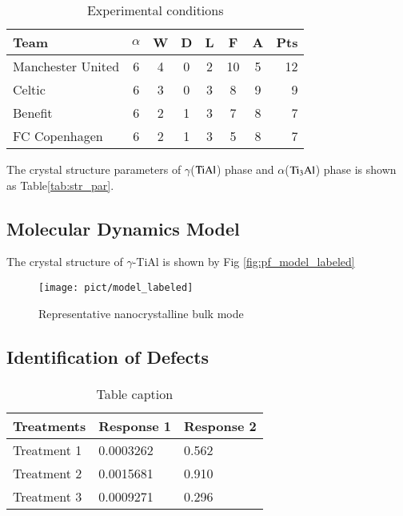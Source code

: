 \documentclass[final,5p,times,twocolumn]{elsarticle}
\begin{document}
\begin{table}[H]
\centering
\caption{Experimental conditions}
\begin{tabular}{l*{6}{c}r}	
		\hline
		Team              & $\alpha$ & W & D & L & F  & A & Pts \\
		\hline
		Manchester United & 6 & 4 & 0 & 2 & 10 & 5 & 12  \\
		Celtic            & 6 & 3 & 0 & 3 &  8 & 9 &  9  \\
		Benefit          & 6 & 2 & 1 & 3 &  7 & 8 &  7  \\
		FC Copenhagen     & 6 & 2 & 1 & 3 &  5 & 8 &  7  \\
		\hline
\end{tabular}
\label{Tab:par}
\end{table}


The crystal structure parameters of $\gamma$($\rm TiAl$) phase and $\alpha$($\rm Ti_3Al$) phase is shown as Table\ref{tab:str_par}. 
\subsection{Molecular Dynamics Model}
The crystal structure of $\gamma$-TiAl
is shown by Fig \ref{fig:pf_model_labeled}

\begin{figure}
	\centering
	\texttt{[image: pict/model\_labeled]}
	\caption{Representative nanocrystalline bulk mode}
	\centering
	\label{fig:pf_model}
\end{figure}
\subsection{Identification of Defects}
\paragraph{}
 \begin{table}[h]
 	\centering
 	\caption{Table caption}
 	\begin{tabular}{l l l}
 		\hline
 		\textbf{Treatments} & \textbf{Response 1} & \textbf{Response 2}\\
 		\hline
 		Treatment 1 & 0.0003262 & 0.562 \\
 		Treatment 2 & 0.0015681 & 0.910 \\
 		Treatment 3 & 0.0009271 & 0.296 \\
 		\hline
 	\end{tabular}
 	
 \end{table}
\end{document}

